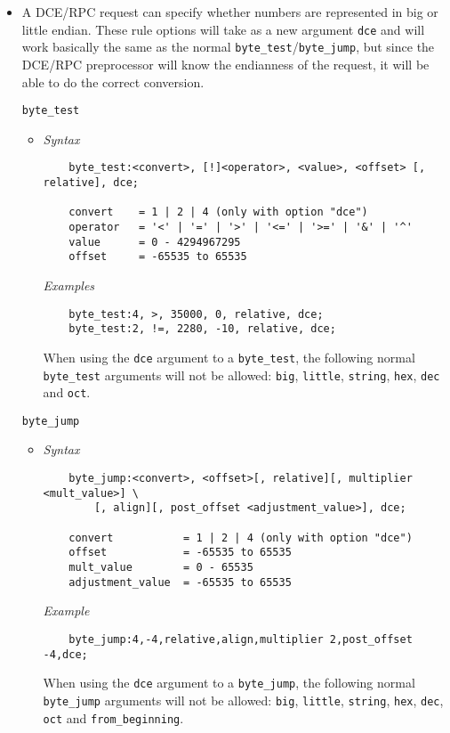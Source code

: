 \documentclass[english]{report}
\begin{document}
\begin{itemize}

\item[] A DCE/RPC request can specify whether numbers are represented in big or
little endian. These rule options will take as a new argument \texttt{dce} and
will work basically the same as the normal
\texttt{byte\_test}/\texttt{byte\_jump}, but since the DCE/RPC preprocessor
will know the endianness of the request, it will be able to do the correct
conversion.

\texttt{byte\_test}
\begin{itemize}
\item[] \textit{Syntax}
\footnotesize
\begin{verbatim}
    byte_test:<convert>, [!]<operator>, <value>, <offset> [, relative], dce;

    convert    = 1 | 2 | 4 (only with option "dce")
    operator   = '<' | '=' | '>' | '<=' | '>=' | '&' | '^'
    value      = 0 - 4294967295
    offset     = -65535 to 65535
\end{verbatim}
\normalsize

\textit{Examples}
\footnotesize
\begin{verbatim}
    byte_test:4, >, 35000, 0, relative, dce;
    byte_test:2, !=, 2280, -10, relative, dce;
\end{verbatim}
\normalsize

When using the \texttt{dce} argument to a \texttt{byte\_test}, the following
normal \texttt{byte\_test} arguments will not be allowed: \texttt{big},
\texttt{little}, \texttt{string}, \texttt{hex}, \texttt{dec} and \texttt{oct}.
\end{itemize}

\texttt{byte\_jump}
\begin{itemize}
\item[] \textit{Syntax}
\footnotesize
\begin{verbatim}
    byte_jump:<convert>, <offset>[, relative][, multiplier <mult_value>] \
        [, align][, post_offset <adjustment_value>], dce;

    convert           = 1 | 2 | 4 (only with option "dce")
    offset            = -65535 to 65535
    mult_value        = 0 - 65535
    adjustment_value  = -65535 to 65535
\end{verbatim}
\normalsize

\textit{Example}
\footnotesize
\begin{verbatim}
    byte_jump:4,-4,relative,align,multiplier 2,post_offset -4,dce;
\end{verbatim}
\normalsize

When using the \texttt{dce} argument to a \texttt{byte\_jump}, the following
normal \texttt{byte\_jump} arguments will not be allowed: \texttt{big},
\texttt{little}, \texttt{string}, \texttt{hex}, \texttt{dec}, \texttt{oct} and
\texttt{from\_beginning}.

\end{itemize}
\end{itemize}
\end{document}
